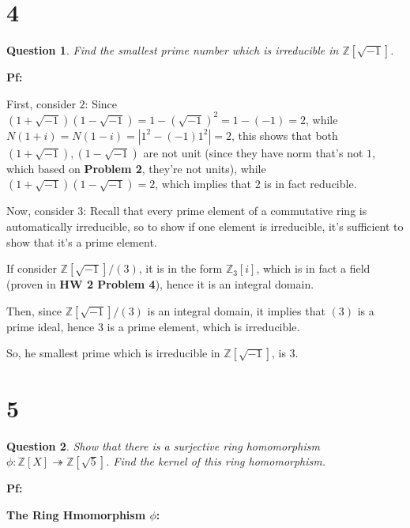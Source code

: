 \documentclass{article}
\newtheorem{question}{Question}
\begin{document}
\break

\section*{4}
\begin{myBox}[]{}
    \begin{question}
        Find the smallest prime number which is irreducible in $\mathbb{Z}[\sqrt{-1}]$.
    \end{question}
\end{myBox}

\textbf{Pf:}

First, consider $2$: Since $(1+\sqrt{-1})(1-\sqrt{-1})=1-(\sqrt{-1})^2 = 1-(-1)=2$, while $N(1+i)=N(1-i)=|1^2-(-1)1^2| = 2$, 
this shows that both $(1+\sqrt{-1}),(1-\sqrt{-1})$ are not unit (since they have norm that's not $1$, which based on \textbf{Problem 2},
they're not units), while $(1+\sqrt{-1})(1-\sqrt{-1})=2$, which implies that $2$ is in fact reducible.

\hfil

Now, consider $3$: Recall that every prime element of a commutative ring is automatically irreducible, so to show if one element is irreducible,
it's sufficient to show that it's a prime element.

If consider $\mathbb{Z}[\sqrt{-1}]/(3)$, it is in the form $\mathbb{Z}_3[i]$, which is in fact a field (proven in \textbf{HW 2 Problem 4}), 
hence it is an integral domain.

Then, since $\mathbb{Z}[\sqrt{-1}]/(3)$ is an integral domain, it implies that $(3)$ is a prime ideal, hence $3$ is a prime element, which is irreducible.

So, he smallest prime which is irreducible in $\mathbb{Z}[\sqrt{-1}]$, is $3$.

\break

\section*{5}
\begin{myBox}[]{}
    \begin{question}
        Show that there is a surjective ring homomorphism $\phi:\mathbb{Z}[X]\twoheadrightarrow \mathbb{Z}[\sqrt{5}]$. Find the
kernel of this ring homomorphism.
    \end{question}
\end{myBox}

\textbf{Pf:}

\textbf{The Ring Hmomorphism $\phi$:}
\end{document}
